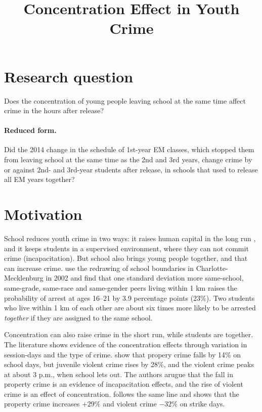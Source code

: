 
\title{Concentration Effect in Youth Crime}

\section{Research question}

\noindent Does the concentration of young people leaving school at the same time
affect crime in the hours after release?

\paragraph{Reduced form.} Did the 2014 change in the schedule of 1st-year EM
classes, which stopped them from leaving school at the same time as the 2nd
and 3rd years, change crime by or against 2nd- and 3rd-year students after
release, in schools that used to release all EM years together?

 \section{Motivation}

School reduces youth crime in two ways: it raises human capital in the long
run \citep{lochner2004}, and it keeps students in a supervised environment, where they can not commit crime 
(incapacitation). But school also brings young people
together, and that can increase crime. \citet{billings2019} use the redrawing of
school boundaries in Charlotte-Mecklenburg in 2002 and find that one standard
deviation more same-school, same-grade, same-race and same-gender peers living
within 1 km raises the probability of arrest at ages 16--21 by 3.9 percentage
points (23\%). Two students who live within 1 km of each other are about six
times more likely to be arrested \emph{together} if they are assigned to the
same school.

Concentration can also raise crime in the short run, while students are
together. The literature shows evidence of the concentration effects through variation in session-days and the
type of crime. \citet{jacob2003} show that propery crime falls by 14\% on school days, but juvenile
violent crime rises by 28\%, and the violent crime peaks at about 3 p.m.,
when school lets out. The authors arugue that the fall in property crime is an evidence of incapacitation effects,
 and the rise of violent crime is an effect of concentration.  \citet{luallen2006} follows the same line and shows that the
property crime increases
$+29\%$ and violent crime $-32\%$ on strike days. 


